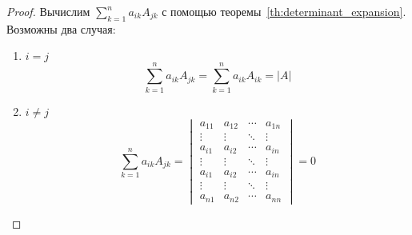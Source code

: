 \begin{proof}
Вычислим $\displaystyle \sum_{k=1}^n a_{ik} A_{jk}$ с помощью теоремы~\ref{th:determinant_expansion}.
Возможны два случая:
\begin{enumerate}
	\item $i = j$
	\begin{equation*}
	\sum_{k=1}^n a_{ik} A_{jk} =
	\sum_{k=1}^n a_{ik} A_{ik} =
	|A|
	\end{equation*}
	
	\item $i \neq j$
	\begin{equation*}
	\sum_{k=1}^n a_{ik} A_{jk} =
	\begin{vmatrix}
	a_{11} & a_{12} & \cdots & a_{1n} \\
	\vdots & \vdots & \ddots & \vdots \\
	a_{i1} & a_{i2} & \cdots & a_{in} \\
	\vdots & \vdots & \ddots & \vdots \\
	a_{i1} & a_{i2} & \cdots & a_{in} \\
	\vdots & \vdots & \ddots & \vdots \\
	a_{n1} & a_{n2} & \cdots & a_{nn}
	\end{vmatrix} = 0
	\end{equation*}
\end{enumerate}


\end{proof}
